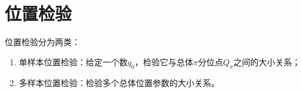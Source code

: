 \chapter{位置检验}

位置检验分为两类：
\begin{enumerate}
	\item 单样本位置检验：给定一个数$q_0$，检验它与总体$\pi$分位点$Q_{\pi}$之间的大小关系；
	\item 多样本位置检验：检验多个总体位置参数的大小关系。
\end{enumerate}




